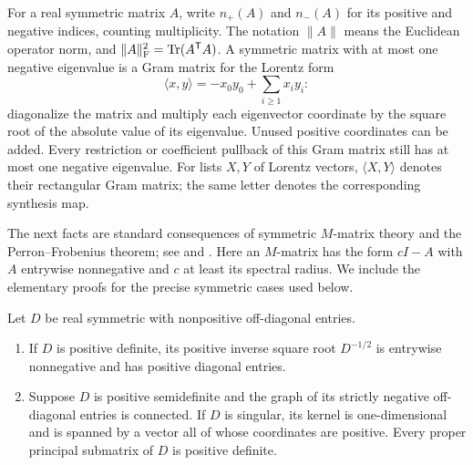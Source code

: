 For a real symmetric matrix $A$, write $n_+(A)$ and $n_-(A)$ for its
positive and negative indices, counting multiplicity.  The notation
$\|A\|$ means the Euclidean operator norm, and
$\|A\|_{\mathrm F}^2=\operatorname{Tr}(A^{\mathsf T}A)$.  A symmetric matrix with
at most one negative eigenvalue is a Gram matrix for the Lorentz form
\[
  \langle x,y\rangle=-x_0y_0+\sum_{i\ge1}x_i y_i:
\]
diagonalize the matrix and multiply each eigenvector coordinate by the
square root of the absolute value of its eigenvalue.  Unused positive
coordinates can be added.  Every restriction or coefficient pullback of
this Gram matrix still has at most one negative eigenvalue.  For lists
$X,Y$ of Lorentz vectors, $\langle X,Y\rangle$ denotes their rectangular
Gram matrix; the same letter denotes the corresponding synthesis map.

The next facts are standard consequences of symmetric $M$-matrix
theory and the Perron--Frobenius theorem; see
\citet[Theorem~5.2]{FiedlerSchneider1983Analytic} and
\citet[Theorem~I]{DebreuHerstein1953Nonnegative}.
Here an $M$-matrix has the form $cI-A$ with $A$ entrywise
nonnegative and $c$ at least its spectral radius. We include the
elementary proofs for the precise symmetric cases used below.

\begin{lemma}\label{mr:positive-block}
Let $D$ be real symmetric with nonpositive off-diagonal entries.
\begin{enumerate}[label=\textup{(\roman*)}]
\item If $D$ is positive definite, its positive inverse square root
$D^{-1/2}$ is entrywise nonnegative and has positive diagonal entries.
\item Suppose $D$ is positive semidefinite and the graph of its strictly
negative off-diagonal entries is connected.  If $D$ is singular, its
kernel is one-dimensional and is spanned by a vector all of whose
coordinates are positive.  Every proper principal submatrix of $D$ is
positive definite.
\end{enumerate}
\end{lemma}

